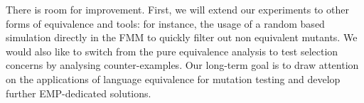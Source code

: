 There is room for improvement. First, we will extend our experiments to other forms of equivalence and tools: for instance, the usage of a random based simulation directly in the FMM to quickly filter out non equivalent mutants. We would also like to switch from the pure equivalence analysis to test selection concerns by analysing counter-examples. Our long-term goal is to draw attention on the applications of language equivalence for mutation testing and develop further EMP-dedicated solutions.      




